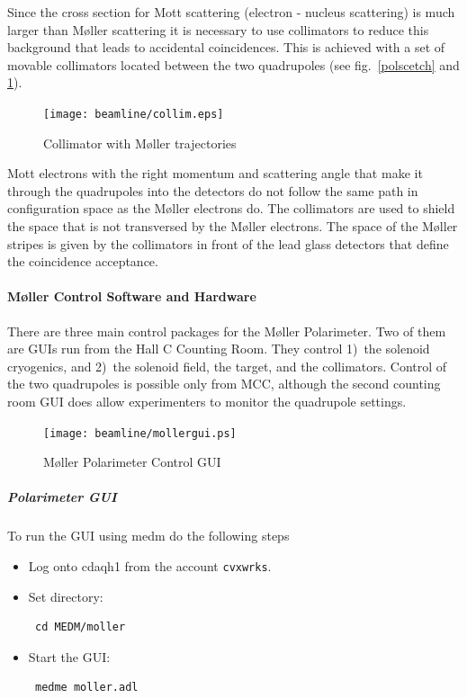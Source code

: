 Since the cross section for Mott scattering (electron - nucleus
scattering) is much larger than M\o ller scattering it is necessary
to use collimators to reduce this background that leads to accidental
coincidences. This is achieved with a set of movable collimators
located between the two quadrupoles (see fig.~\ref{polscetch} 
and \ref{colscetch}). 
%
\begin{figure}
\texttt{[image: beamline/collim.eps]}
\begin{center}
\caption{Collimator with M\o ller trajectories\label{colscetch}}
\end{center}
\end{figure}
Mott electrons with the right momentum and scattering angle that make it
through the quadrupoles into the detectors do not follow the same
path in configuration space as 
the M\o ller electrons do.  The collimators are used to shield the
space that is not transversed by the M\o ller electrons. The space of
the M\o ller stripes is  
given by the collimators in front of the lead glass detectors
that define the coincidence acceptance.
%

\paragraph{M\o ller Control Software and Hardware}
There are three main control packages for the M\o ller Polarimeter.
Two of them are GUIs run from the Hall C Counting Room. They
control 1)~the solenoid cryogenics, and 2)~the solenoid field, 
the target, and the collimators. Control of the two quadrupoles
is possible only from MCC, although the second counting room GUI does
allow experimenters to monitor the quadrupole settings.


\begin{figure}
  \begin{center}
  \texttt{[image: beamline/mollergui.ps]}
  \caption{M\o ller Polarimeter Control GUI\label{molpolmedm}}
  \end{center}
\end{figure}
%

\subparagraph{Polarimeter GUI}

To run the GUI using medm do the following steps
\begin{itemize}
\item Log onto cdaqh1 from the account {\tt cvxwrks}.
\item Set directory: \begin{verbatim} cd MEDM/moller \end{verbatim}
\item Start the GUI: \begin{verbatim} medme moller.adl  \end{verbatim} 
\end{itemize}
%

